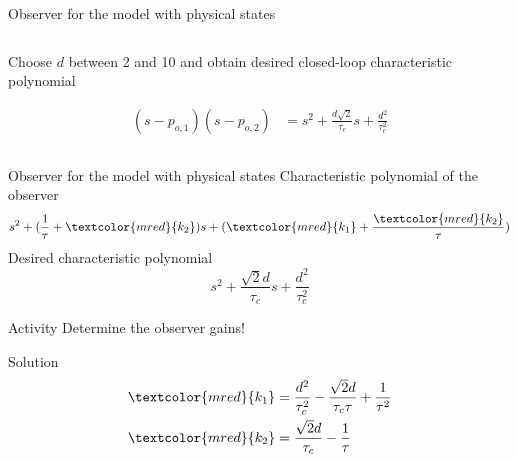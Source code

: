 \documentclass[presentation,aspectratio=169]{beamer}
\begin{document}
\begin{frame}[label={sec:org146a8f1}]{Observer for the model with physical states}
\begin{columns}
\begin{column}{0.4\columnwidth}
\begin{center}
\end{center}

Choose \(d\) between 2 and 10 and  obtain desired closed-loop characteristic polynomial

\begin{align*}
  (s-p_{o,1})(s-p_{o,2}) &= s^2 + \frac{d\sqrt{2}}{\tau_c}s + \frac{d^2}{\tau_c^2}
\end{align*}
\end{column}
\end{columns}
\end{frame}

\begin{frame}[label={sec:org4823eac}]{Observer for the model with physical states}
Characteristic polynomial of the observer 
\[s^2 + (\frac{1}{\tau} + \textcolor{mred}{k_2})s + (\textcolor{mred}{k_1}+\frac{\textcolor{mred}{k_2}}{\tau})\]
Desired characteristic polynomial
\[  s^2 + \frac{\sqrt{2}d}{\tau_c}s + \frac{d^2}{\tau_c^2}\]
\pause

\alert{Activity}
Determine the observer gains!

\pause
\alert{Solution}
\pause
\begin{align*}
 \textcolor{mred}{k_1} &= \frac{d^2}{\tau_c^2} - \frac{\sqrt{2}d}{\tau_c\tau} + \frac{1}{\tau^2}\\
 \textcolor{mred}{k_2} &= \frac{\sqrt{2}d}{\tau_c} - \frac{1}{\tau} 
\end{align*}
\end{frame}
\end{document}
